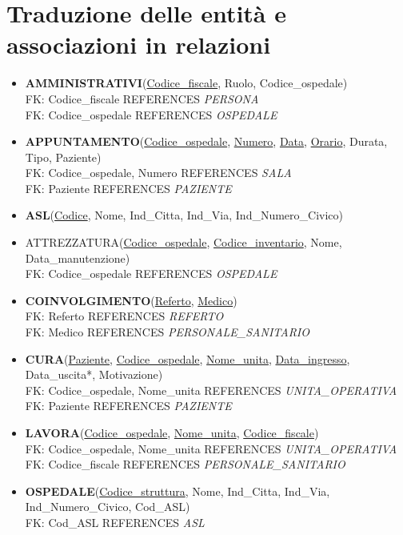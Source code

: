 \documentclass[a4paper,12pt]{report}
\begin{document}
\section{Traduzione delle entità e associazioni in relazioni}
\begin{itemize}
  \item \textbf{AMMINISTRATIVI}(\underline{Codice\_fiscale}, Ruolo, Codice\_ospedale) 
  \\ FK: Codice\_fiscale REFERENCES \emph{PERSONA}
  \\ FK: Codice\_ospedale REFERENCES \emph{OSPEDALE}
  \item \textbf{APPUNTAMENTO}(\underline{Codice\_ospedale}, \underline{Numero}, \underline{Data}, \underline{Orario}, Durata, Tipo, Paziente)
  \\ FK: Codice\_ospedale, Numero REFERENCES \emph{SALA}
  \\ FK: Paziente REFERENCES \emph{PAZIENTE}
  \item \textbf{ASL}(\underline{Codice}, Nome, Ind\_Citta, Ind\_Via, Ind\_Numero\_Civico)
  \item ATTREZZATURA(\underline{Codice\_ospedale}, \underline{Codice\_inventario}, Nome, Data\_manutenzione)
  \\ FK: Codice\_ospedale REFERENCES \emph{OSPEDALE}
  \item \textbf{COINVOLGIMENTO}(\underline{Referto}, \underline{Medico})
  \\ FK: Referto REFERENCES \emph{REFERTO}
  \\ FK: Medico REFERENCES \emph{PERSONALE\_SANITARIO}
  \item \textbf{CURA}(\underline{Paziente}, \underline{Codice\_ospedale}, \underline{Nome\_unita}, \underline{Data\_ingresso}, Data\_uscita*, Motivazione)
  \\ FK: Codice\_ospedale, Nome\_unita REFERENCES \emph{UNITA\_OPERATIVA}
  \\ FK: Paziente REFERENCES \emph{PAZIENTE}
  \item \textbf{LAVORA}(\underline{Codice\_ospedale}, \underline{Nome\_unita}, \underline{Codice\_fiscale})
  \\ FK: Codice\_ospedale, Nome\_unita REFERENCES \emph{UNITA\_OPERATIVA}
  \\ FK: Codice\_fiscale REFERENCES \emph{PERSONALE\_SANITARIO}
  \item \textbf{OSPEDALE}(\underline{Codice\_struttura}, Nome, Ind\_Citta, Ind\_Via, Ind\_Numero\_Civico, Cod\_ASL)
  \\ FK: Cod\_ASL REFERENCES \emph{ASL}

\end{itemize}
\end{document}
